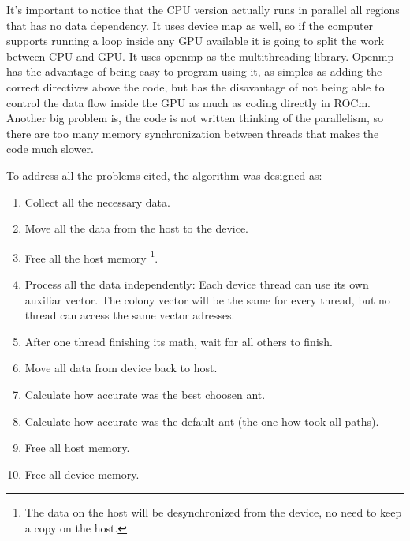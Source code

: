 It's important to notice that the CPU version actually runs in parallel all
regions that has no data dependency. It uses device map as well, so if the computer
supports running a loop inside any GPU available it is going to split the work between CPU and GPU.
It uses openmp as the multithreading library. Openmp has the advantage of being easy
to program using it, as simples as adding the correct directives above the code, but
has the disavantage of not being able to control the data flow inside the GPU as much
as coding directly in ROCm. Another big problem is, the code is not written thinking
of the parallelism, so there are too many memory synchronization between threads
that makes the code much slower.

To address all the problems cited, the algorithm was designed as:

\begin{enumerate}
    \item Collect all the necessary data.
    \item Move all the data from the host to the device.
    \item Free all the host memory \footnote{The data on the host will be desynchronized from the device, no need to keep a copy on the host.}.
    \item Process all the data independently:
    \subitem Each device thread can use its own auxiliar vector.
    \subitem The colony vector will be the same for every thread, but no thread can access the same vector adresses.
    \item After one thread finishing its math, wait for all others to finish.
    \item Move all data from device back to host.
    \item Calculate how accurate was the best choosen ant.
    \item Calculate how accurate was the default ant (the one how took all paths).
    \item Free all host memory.
    \item Free all device memory.
\end{enumerate}
